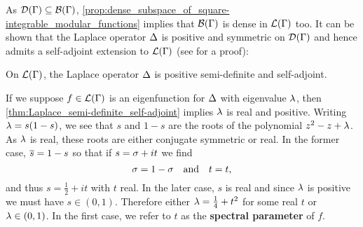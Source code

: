       As $\mathcal{D}(\Gamma) \subseteq \mathcal{B}(\Gamma)$, \cref{prop:dense_subspace_of_square-integrable_modular_functions} implies that $\mathcal{B}(\Gamma)$ is dense in $\mathcal{L}(\Gamma)$ too. It can be shown that the Laplace operator $\Delta$ is positive and symmetric on $\mathcal{D}(\Gamma)$ and hence admits a self-adjoint extension to $\mathcal{L}(\Gamma)$ (see \cite{iwaniec2002spectral} for a proof):

      \begin{theorem}\label{thm:Laplace_semi-definite_self-adjoint}
        On $\mathcal{L}(\Gamma)$, the Laplace operator $\Delta$ is positive semi-definite and self-adjoint.
      \end{theorem}

      If we suppose $f \in \mathcal{L}(\Gamma)$ is an eigenfunction for $\Delta$ with eigenvalue $\lambda$, then \cref{thm:Laplace_semi-definite_self-adjoint} implies $\lambda$ is real and positive. Writing $\lambda = s(1-s)$, we see that $s$ and $1-s$ are the roots of the polynomial $z^{2}-z+\lambda$. As $\lambda$ is real, these roots are either conjugate symmetric or real. In the former case, $\overline{s} = 1-s$ so that if $s = \sigma+it$ we find
      \[
        \sigma = 1-\sigma \quad \text{and} \quad t = t,
      \]
      and thus $s = \frac{1}{2}+it$ with $t$ real. In the later case, $s$ is real and since $\lambda$ is positive we must have $s \in (0,1)$. Therefore either $\lambda = \frac{1}{4}+t^{2}$ for some real $t$ or $\lambda \in (0,1)$. In the first case, we refer to $t$ as the \textbf{spectral parameter} of $f$.

